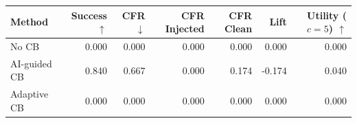 \begin{tabular}{lrrrrrr}
\toprule
Method & Success $\uparrow$ & CFR $\downarrow$ & CFR Injected & CFR Clean & Lift & Utility ($c=5$) $\uparrow$ \\
\midrule
No CB & 0.000 & 0.000 & 0.000 & 0.000 & 0.000 & 0.000 \\
AI-guided CB & 0.840 & 0.667 & 0.000 & 0.174 & -0.174 & 0.040 \\
Adaptive CB & 0.000 & 0.000 & 0.000 & 0.000 & 0.000 & 0.000 \\
\bottomrule
\end{tabular}
